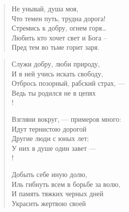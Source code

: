 \newpage
\vspace*{0cm}


\begin{verse}
\begin{altverse}
Не унывай, душа моя,\\
Что темен путь, трудна дорога!\\
    Стремись к добру, огнем горя…\\
Любить кто хочет свет и Бога –\\
Пред тем во тьме горит заря.
\end{altverse}
\end{verse}

\newpage
\vspace*{0cm}


\begin{verse}
Служи добру, люби природу,\\
И в ней учись искать свободу,\\
Отбрось позорный, рабский страх, ---\\
Ведь ты родился не в цепях\ldotst\\!

Взгляни вокруг, --- примеров много:\\
Идут тернистою дорогой\\
Другие люди с юных лет;\\
У них в душе один завет ---\\!

Добыть себе иную долю,\\
Иль гибнуть всем в борьбе за волю,\\
И память тяжких черных дней\\
Украсить жертвою своей\ldotst
\end{verse}

\newpage
\vspace*{0cm}


